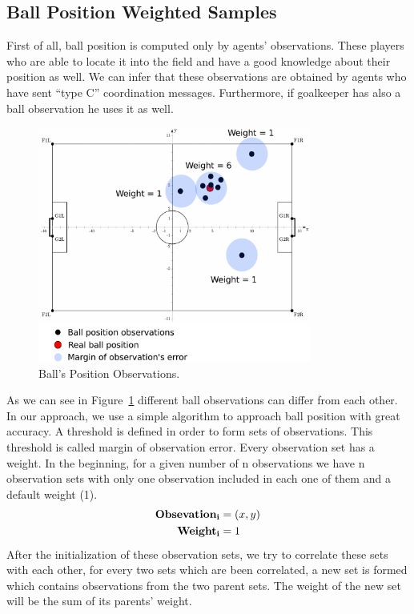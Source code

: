 \subsection{Ball Position Weighted Samples}
First of all, ball position is computed only by agents' observations. These players who are able to locate it into the field and have a good knowledge about their position as well. We can infer that these observations are obtained by agents who have sent ``type C'' coordination messages. Furthermore, if goalkeeper has also a ball observation he uses it as well.
\begin{figure}[t!]
\centering
  \includegraphics[width=0.8\textwidth]{Chapter4/figures/Ball.pdf}
  \caption{Ball's Position Observations.} 
  \label{fig:Ball}
\end{figure}
As we can see in Figure~\ref{fig:Ball} different ball observations can differ from each other. In our approach, we use a simple algorithm to approach ball position with great accuracy. A threshold is defined in order to form sets of observations. This threshold is called margin of observation error. Every observation set has a weight. In the beginning, for a given number of n observations we have n observation sets with only one observation included in each one of them and a default weight (1).
\begin{align*}
{\bf Obsevation_{i} } &= (x,y) \\ 
{\bf Weight_{i}} &= 1
\end{align*}
After the initialization of these observation sets, we try to correlate these sets with each other, for every two sets which are been correlated, a new set is formed which contains observations from the two parent sets. The weight of the new set will be the sum of its parents' weight.\\
